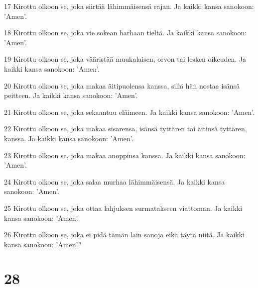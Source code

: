 \par 17 Kirottu olkoon se, joka siirtää lähimmäisensä rajan. Ja kaikki kansa sanokoon: 'Amen'.
\par 18 Kirottu olkoon se, joka vie sokean harhaan tieltä. Ja kaikki kansa sanokoon: 'Amen'.
\par 19 Kirottu olkoon se, joka vääristää muukalaisen, orvon tai lesken oikeuden. Ja kaikki kansa sanokoon: 'Amen'.
\par 20 Kirottu olkoon se, joka makaa äitipuolensa kanssa, sillä hän nostaa isänsä peitteen. Ja kaikki kansa sanokoon: 'Amen'.
\par 21 Kirottu olkoon se, joka sekaantuu eläimeen. Ja kaikki kansa sanokoon: 'Amen'.
\par 22 Kirottu olkoon se, joka makaa sisarensa, isänsä tyttären tai äitinsä tyttären, kanssa. Ja kaikki kansa sanokoon: 'Amen'.
\par 23 Kirottu olkoon se, joka makaa anoppinsa kanssa. Ja kaikki kansa sanokoon: 'Amen'.
\par 24 Kirottu olkoon se, joka salaa murhaa lähimmäisensä. Ja kaikki kansa sanokoon: 'Amen'.
\par 25 Kirottu olkoon se, joka ottaa lahjuksen surmatakseen viattoman. Ja kaikki kansa sanokoon: 'Amen'.
\par 26 Kirottu olkoon se, joka ei pidä tämän lain sanoja eikä täytä niitä. Ja kaikki kansa sanokoon: 'Amen'."

\chapter{28}

